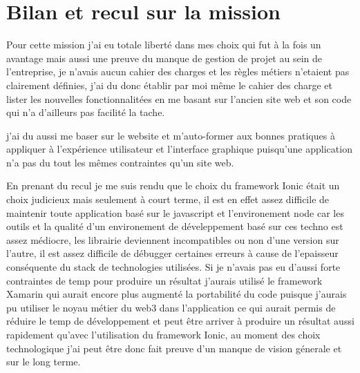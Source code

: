 \newpage
\section{Bilan et recul sur la mission}
Pour cette mission j'ai eu totale liberté dans mes choix qui fut à la fois un avantage mais 
aussi une preuve du manque de gestion de projet au sein de l'entreprise, je n'avais 
aucun cahier des charges et les règles métiers n'etaient pas clairement définies,
j'ai du donc établir par moi même le cahier des charge et lister les nouvelles fonctionnalitées 
en me basant sur l'ancien site web et son code qui n'a d'ailleurs pas facilité la tache. \newline

j'ai du aussi me baser sur le website et m'auto-former aux bonnes pratiques 
à appliquer à l'expérience utilisateur et l'interface graphique puisqu'une application
n'a pas du tout les mêmes contraintes qu'un site web. \newline

En prenant du recul je me suis rendu que le choix du framework Ionic était un choix judicieux 
mais seulement à court terme, il est en effet assez difficile de maintenir toute 
application basé sur le javascript et l'environement node car les outils et la qualité 
d'un environement de déveleppement basé sur ces techno est assez médiocre, les librairie 
deviennent incompatibles ou non d'une version sur l'autre, il est assez difficile 
de débugger certaines erreurs à cause de l'epaisseur conséquente du stack de technologies
utilisées. Si je n'avais pas eu d'aussi forte contraintes de temp pour produire un résultat 
j'aurais utilisé le framework Xamarin qui aurait encore plus augmenté la portabilité 
du code puisque j'aurais pu utiliser le noyau métier du web3 dans l'application
ce qui aurait permis de réduire le temp de développement et peut être arriver 
à produire un résultat aussi rapidement qu'avec l'utilisation du framework Ionic, 
au moment des choix technologique j'ai peut être donc fait preuve d'un manque de vision génerale
et sur le long terme. \newline


